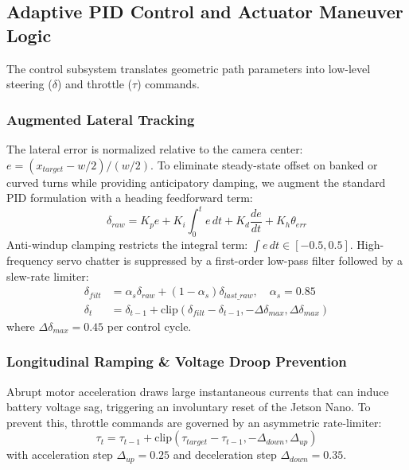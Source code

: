 \documentclass[conference]{IEEEtran}
\begin{document}
\subsection{Adaptive PID Control and Actuator Maneuver Logic}
The control subsystem translates geometric path parameters into low-level steering ($\delta$) and throttle ($\tau$) commands.

\subsubsection{Augmented Lateral Tracking}
The lateral error is normalized relative to the camera center: $e = (x_{target} - w/2) / (w/2)$. To eliminate steady-state offset on banked or curved turns while providing anticipatory damping, we augment the standard PID formulation with a heading feedforward term:
\begin{equation}
    \delta_{raw} = K_p e + K_i \int_{0}^{t} e \, dt + K_d \frac{de}{dt} + K_h \theta_{err}
\end{equation}
Anti-windup clamping restricts the integral term: $\int e \, dt \in [-0.5, 0.5]$. High-frequency servo chatter is suppressed by a first-order low-pass filter followed by a slew-rate limiter:
\begin{align}
    \delta_{filt} & = \alpha_s \delta_{raw} + (1 - \alpha_s) \delta_{last\_raw}, \quad \alpha_s = 0.85                    \\
    \delta_t      & = \delta_{t-1} + \text{clip}(\delta_{filt} - \delta_{t-1}, -\Delta \delta_{max}, \Delta \delta_{max})
\end{align}
where $\Delta \delta_{max} = 0.45$ per control cycle.

\subsubsection{Longitudinal Ramping \& Voltage Droop Prevention}
Abrupt motor acceleration draws large instantaneous currents that can induce battery voltage sag, triggering an involuntary reset of the Jetson Nano. To prevent this, throttle commands are governed by an asymmetric rate-limiter:
\begin{equation}
    \tau_t = \tau_{t-1} + \text{clip}(\tau_{target} - \tau_{t-1}, -\Delta_{down}, \Delta_{up})
\end{equation}
with acceleration step $\Delta_{up} = 0.25$ and deceleration step $\Delta_{down} = 0.35$.
\end{document}
